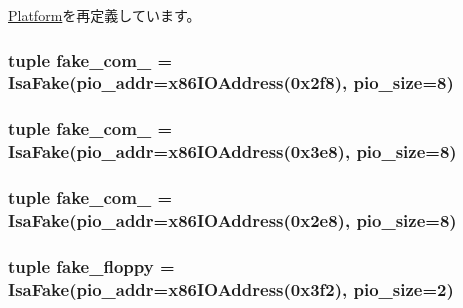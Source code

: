 \hyperlink{classPlatform_1_1Platform_a17da7064bc5c518791f0c891eff05fda}{Platform}を再定義しています。\hypertarget{classPc_1_1Pc_a99f7bdc1effd02a5b4cfe1fa1bbe6423}{
\subsubsection[{fake\_\-com\_\-2}]{\setlength{\rightskip}{0pt plus 5cm}tuple {\bf fake\_\-com\_} = {\bf IsaFake}(pio\_\-addr=x86IOAddress(0x2f8), pio\_\-size=8)}}
\label{classPc_1_1Pc_a99f7bdc1effd02a5b4cfe1fa1bbe6423}
\hypertarget{classPc_1_1Pc_a0619d8ae413c1a62cd9564fd80532a23}{
\subsubsection[{fake\_\-com\_\-3}]{\setlength{\rightskip}{0pt plus 5cm}tuple {\bf fake\_\-com\_} = {\bf IsaFake}(pio\_\-addr=x86IOAddress(0x3e8), pio\_\-size=8)}}
\label{classPc_1_1Pc_a0619d8ae413c1a62cd9564fd80532a23}
\hypertarget{classPc_1_1Pc_a8c33088f1791dbb88161395c32705864}{
\subsubsection[{fake\_\-com\_\-4}]{\setlength{\rightskip}{0pt plus 5cm}tuple {\bf fake\_\-com\_} = {\bf IsaFake}(pio\_\-addr=x86IOAddress(0x2e8), pio\_\-size=8)}}
\label{classPc_1_1Pc_a8c33088f1791dbb88161395c32705864}
\hypertarget{classPc_1_1Pc_a201a3870119ab6c7641e943a9216b0c1}{
\subsubsection[{fake\_\-floppy}]{\setlength{\rightskip}{0pt plus 5cm}tuple {\bf fake\_\-floppy} = {\bf IsaFake}(pio\_\-addr=x86IOAddress(0x3f2), pio\_\-size=2)}}
